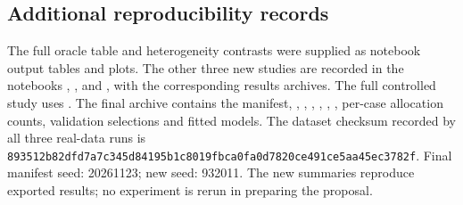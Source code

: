 \documentclass[10pt,letterpaper]{article}
\begin{document}
\subsection{Additional reproducibility records}
The full oracle table and heterogeneity contrasts were supplied as notebook output tables and plots. The other three new studies are recorded in the notebooks , , and , with the corresponding results archives. The full controlled study uses . The final archive contains the manifest, , , , , , , per-case allocation counts, validation selections and fitted models. The dataset checksum recorded by all three real-data runs is \texttt{893512b82dfd7a7c345d84195b1c8019fbca0fa0d7820ce491ce5aa45ec3782f}. Final manifest seed: 20261123; new seed: 932011. The new summaries reproduce exported results; no experiment is rerun in preparing the proposal.
\clearpage
\end{document}
